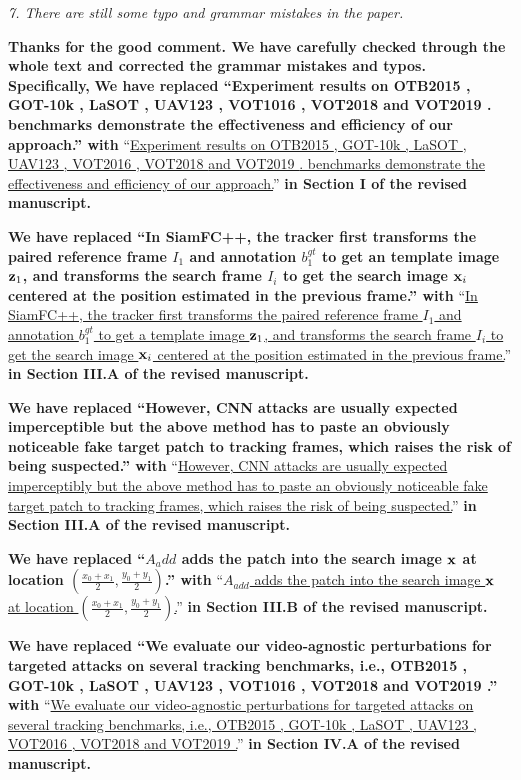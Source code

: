 \documentclass[12pt]{article}
\begin{document}
\textit{7. There are still some typo and grammar mistakes in the paper.}

\textbf{Thanks for the good comment. We have carefully checked through the whole text and corrected the grammar mistakes and typos. Specifically,}
\textbf{We have replaced ``Experiment results on OTB2015 \cite{OTB}, GOT-10k \cite{GOT-10k}, LaSOT \cite{GOT-10k}, UAV123 \cite{UAV123}, VOT1016 \cite{VOT2016}, VOT2018 \cite{VOT2018} and VOT2019 \cite{VOT2019}. benchmarks demonstrate the effectiveness and efficiency of our approach.'' with}
``\uline{Experiment results on OTB2015 \cite{OTB}, GOT-10k \cite{GOT-10k}, LaSOT \cite{LaSOT}, UAV123 \cite{UAV123}, VOT2016 \cite{VOT2016}, VOT2018 \cite{VOT2018} and VOT2019 \cite{VOT2019}. benchmarks demonstrate the effectiveness and efficiency of our approach.}''
\textbf{in Section I of the revised manuscript.}

\textbf{We have replaced ``In SiamFC++, the tracker first transforms the paired reference frame $I_1$ and annotation $b_1^{gt}$ to get an template image $\textbf z_1$, and transforms the search frame $I_i$ to get the search image $\textbf x_i$ centered at the position estimated in the previous frame.'' with}
``\uline{In SiamFC++, the tracker first transforms the paired reference frame $I_1$ and annotation $b_1^{gt}$ to get a template image $\textbf z_1$, and transforms the search frame $I_i$ to get the search image $\textbf x_i$ centered at the position estimated in the previous frame.}''
\textbf{in Section III.A of the revised manuscript.}

\textbf{We have replaced ``However, CNN attacks are usually expected imperceptible but the above method has to paste an obviously noticeable fake target patch to tracking frames, which raises the risk of being suspected.'' with}
``\uline{However, CNN attacks are usually expected imperceptibly but the above method has to paste an obviously noticeable fake target patch to tracking frames, which raises the risk of being suspected.}''
\textbf{in Section III.A of the revised manuscript.}

\textbf{We have  replaced ``$A_add$ adds the patch into the search image $\textbf x$ at location $(\frac{x_0+x_1}{2},\frac{y_0+y_1}{2})$.'' with}
``\uline{$A_{add}$ adds the patch into the search image $\textbf x$ at location $(\frac{x_0+x_1}{2},\frac{y_0+y_1}{2})$.}''
\textbf{in Section III.B of the revised manuscript.}

\textbf{We have replaced ``We evaluate our video-agnostic perturbations for targeted attacks on several tracking benchmarks, i.e., OTB2015 \cite{OTB}, GOT-10k \cite{GOT-10k}, LaSOT \cite{LaSOT}, UAV123 \cite{UAV123}, VOT1016 \cite{VOT2016}, VOT2018 \cite{VOT2018} and VOT2019 \cite{VOT2019}.'' with}
``\uline{We evaluate our video-agnostic perturbations for targeted attacks on several tracking benchmarks, i.e., OTB2015 \cite{OTB}, GOT-10k \cite{GOT-10k}, LaSOT \cite{LaSOT}, UAV123 \cite{UAV123}, VOT2016 \cite{VOT2016}, VOT2018 \cite{VOT2018} and VOT2019 \cite{VOT2019}.}''
\textbf{in Section IV.A of the revised manuscript.}
\end{document}
